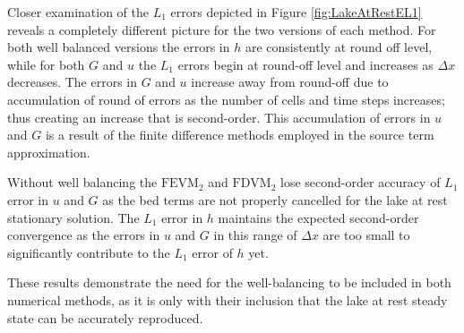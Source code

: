 Closer examination of the $L_1$ errors depicted in Figure \ref{fig:LakeAtRestEL1} reveals a completely different picture for the two versions of each method. For both well balanced versions the errors in $h$ are consistently at round off level, while for both $G$ and $u$ the $L_1$ errors begin at round-off level and increases as $\Delta x$ decreases. The errors in $G$ and $u$ increase away from round-off due to accumulation of round of errors as the number of cells and time steps increases; thus creating an increase that is second-order. This accumulation of errors in $u$ and $G$ is a result of the finite difference methods employed in the source term approximation. 

Without well balancing the $\text{FEVM}_2$ and $\text{FDVM}_2$ lose second-order accuracy of $L_1$ error in $u$ and $G$ as the bed terms are not properly cancelled for the lake at rest stationary solution. The $L_1$ error in $h$ maintains the expected second-order convergence as the errors in $u$ and $G$ in this range of $\Delta x$ are too small to significantly contribute to the $L_1$ error of $h$ yet.

These results demonstrate the need for the well-balancing to be included in both numerical methods, as it is only with their inclusion that the lake at rest steady state can be accurately reproduced. 



